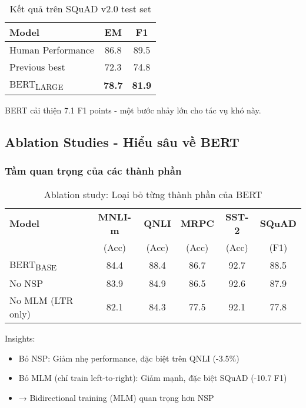 \begin{table}[H]
    \centering
    \caption{Kết quả trên SQuAD v2.0 test set}
    \label{tab:squad_v2_results}
    \begin{tabular}{lcc}
        \toprule
        \textbf{Model} & \textbf{EM} & \textbf{F1} \\
        \midrule
        Human Performance & 86.8 & 89.5 \\
        Previous best & 72.3 & 74.8 \\
        \midrule
        BERT\textsubscript{LARGE} & \textbf{78.7} & \textbf{81.9} \\
        \bottomrule
    \end{tabular}
\end{table}

BERT cải thiện 7.1 F1 points - một bước nhảy lớn cho tác vụ khó này.

\subsection{Ablation Studies - Hiểu sâu về BERT}
\label{ssec:ablation_study}

\subsubsection{Tầm quan trọng của các thành phần}
\begin{table}[H]
    \centering
    \caption{Ablation study: Loại bỏ từng thành phần của BERT}
    \label{tab:ablation_components}
    \begin{tabular}{lccccc}
        \toprule
        \textbf{Model} & \textbf{MNLI-m} & \textbf{QNLI} & \textbf{MRPC} & \textbf{SST-2} & \textbf{SQuAD} \\
        & (Acc) & (Acc) & (Acc) & (Acc) & (F1) \\
        \midrule
        BERT\textsubscript{BASE} & 84.4 & 88.4 & 86.7 & 92.7 & 88.5 \\
        \midrule
        No NSP & 83.9 & 84.9 & 86.5 & 92.6 & 87.9 \\
        No MLM (LTR only) & 82.1 & 84.3 & 77.5 & 92.1 & 77.8 \\
        \bottomrule
    \end{tabular}
\end{table}

Insights:
\begin{itemize}
    \item Bỏ NSP: Giảm nhẹ performance, đặc biệt trên QNLI (-3.5\%)
    \item Bỏ MLM (chỉ train left-to-right): Giảm mạnh, đặc biệt SQuAD (-10.7 F1)
    \item → Bidirectional training (MLM) quan trọng hơn NSP
\end{itemize}

